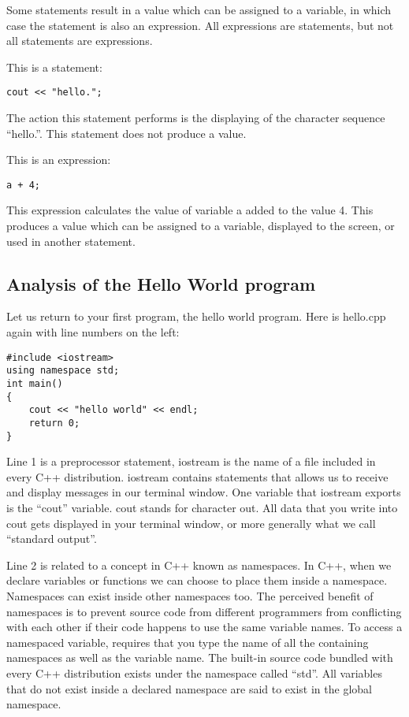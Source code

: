 \documentclass[a4paper,12pt]{article}
\begin{document}
Some statements result in a value which can be assigned to a variable, in which case the statement is also an expression. All expressions are statements, but not all statements are expressions. 

This is a statement: 

\begin{lstlisting}
cout << "hello.";
\end{lstlisting}

The action this statement performs is the displaying of the character sequence ``hello.''. This statement does not produce a value.

This is an expression:

\begin{lstlisting}
a + 4;
\end{lstlisting}

This expression calculates the value of variable a added to the value 4. This produces a value which can be assigned to a variable, displayed to the screen, or used in another statement. 

\subsection*{Analysis of the Hello World program}

Let us return to your first program, the hello world program. Here is hello.cpp again with line numbers on the left:

\lstset{numbers=left}
\begin{lstlisting}
#include <iostream>
using namespace std;
int main()
{
	cout << "hello world" << endl;
	return 0;
}
\end{lstlisting}

Line 1 is a preprocessor statement, iostream is the name of a file included in every C++ distribution. iostream contains statements that allows us to receive and display messages in our terminal window. One variable that iostream exports is the ``cout'' variable. cout stands for character out. All data that you write into cout gets displayed in your terminal window, or more generally what we call ``standard output''. 

Line 2 is related to a concept in C++ known as namespaces. In C++, when we declare variables or functions we can choose to place them inside a namespace. Namespaces can exist inside other namespaces too. The perceived benefit of namespaces is to prevent source code from different programmers from conflicting with each other if their code happens to use the same variable names. To access a namespaced variable, requires that you type the name of all the containing namespaces as well as the variable name. The built-in source code bundled with every C++ distribution exists under the namespace called ``std''. All variables that do not exist inside a declared namespace are said to exist in the global namespace. 
\end{document}
